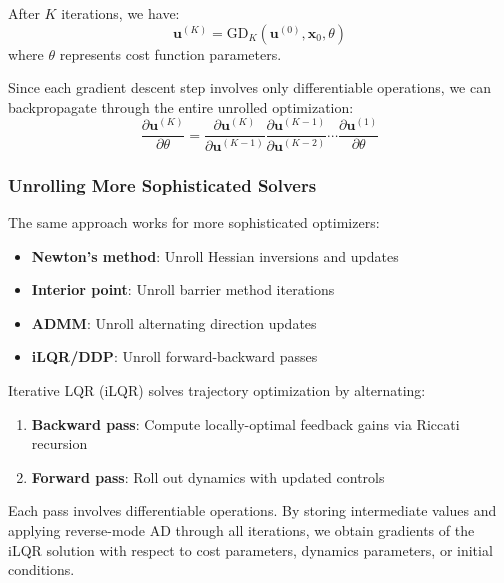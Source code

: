 After $K$ iterations, we have:
\begin{equation}
\mathbf{u}^{(K)} = \text{GD}_K(\mathbf{u}^{(0)}, \mathbf{x}_0, \theta)
\end{equation}
where $\theta$ represents cost function parameters.

Since each gradient descent step involves only differentiable operations, we can backpropagate through the entire unrolled optimization:
\begin{equation}
\frac{\partial \mathbf{u}^{(K)}}{\partial \theta} = \frac{\partial \mathbf{u}^{(K)}}{\partial \mathbf{u}^{(K-1)}} \frac{\partial \mathbf{u}^{(K-1)}}{\partial \mathbf{u}^{(K-2)}} \cdots \frac{\partial \mathbf{u}^{(1)}}{\partial \theta}
\end{equation}

\subsubsection{Unrolling More Sophisticated Solvers}

The same approach works for more sophisticated optimizers:
\begin{itemize}
    \item \textbf{Newton's method}: Unroll Hessian inversions and updates
    \item \textbf{Interior point}: Unroll barrier method iterations
    \item \textbf{ADMM}: Unroll alternating direction updates
    \item \textbf{iLQR/DDP}: Unroll forward-backward passes
\end{itemize}

\begin{example}
\label{ex:diff_ilqr}
Iterative LQR (iLQR) solves trajectory optimization by alternating:
\begin{enumerate}
    \item \textbf{Backward pass}: Compute locally-optimal feedback gains via Riccati recursion
    \item \textbf{Forward pass}: Roll out dynamics with updated controls
\end{enumerate}

Each pass involves differentiable operations. By storing intermediate values and applying reverse-mode AD through all iterations, we obtain gradients of the iLQR solution with respect to cost parameters, dynamics parameters, or initial conditions.
\end{example}

